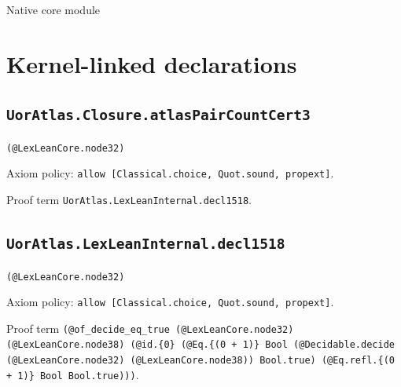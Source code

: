 \documentclass[11pt]{article}
\begin{document}
\begin{center}{\LARGE Native core module}\end{center}
\section*{Kernel-linked declarations}
\subsection*{\texttt{UorAtlas.Closure.atlasPairCountCert3}}
\noindent\texttt{(@LexLeanCore.node32)}\par
\noindent Axiom policy: \texttt{allow [Classical.choice, Quot.sound, propext]}.\par
\noindent Proof term \texttt{UorAtlas.LexLeanInternal.decl1518}.\par
\subsection*{\texttt{UorAtlas.LexLeanInternal.decl1518}}
\noindent\texttt{(@LexLeanCore.node32)}\par
\noindent Axiom policy: \texttt{allow [Classical.choice, Quot.sound, propext]}.\par
\noindent Proof term \texttt{(@of\_decide\_eq\_true (@LexLeanCore.node32) (@LexLeanCore.node38) (@id.\{0\} (@Eq.\{(0 + 1)\} Bool (@Decidable.decide (@LexLeanCore.node32) (@LexLeanCore.node38)) Bool.true) (@Eq.refl.\{(0 + 1)\} Bool Bool.true)))}.\par
\end{document}
